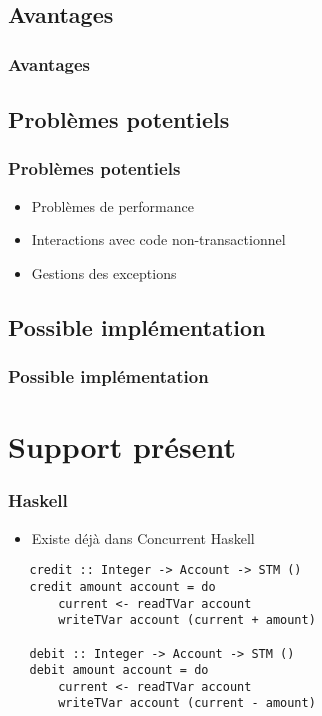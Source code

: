 \documentclass{beamer}
\begin{document}
\subsection{Avantages}
\begin{frame}
\frametitle{Avantages}

\end{frame}

\subsection{Problèmes potentiels}
\begin{frame}
\frametitle{Problèmes potentiels}
\begin{itemize}
\item Problèmes de performance
\item<2-> Interactions avec code non-transactionnel
\item<3-> Gestions des exceptions
\end{itemize}
\end{frame}

\subsection{Possible implémentation}
\begin{frame}
\frametitle{Possible implémentation}

\end{frame}

\section{Support présent}
\begin{frame}[fragile]
\frametitle{Haskell}
\begin{itemize}
\item Existe déjà dans Concurrent Haskell
\end{itemize}
\begin{lstlisting}
   credit :: Integer -> Account -> STM ()
   credit amount account = do
       current <- readTVar account
       writeTVar account (current + amount)
 
   debit :: Integer -> Account -> STM ()
   debit amount account = do
       current <- readTVar account
       writeTVar account (current - amount)
\end{lstlisting}
\end{frame}
\end{document}
